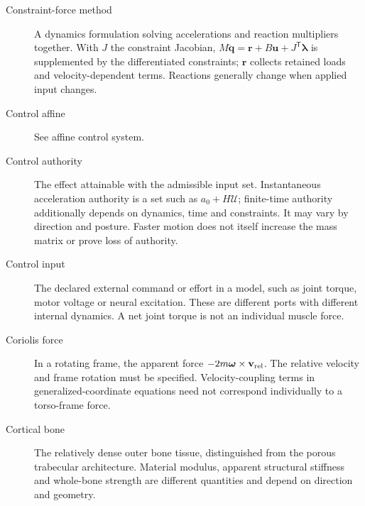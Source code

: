 \begin{description}
\item[Constraint-force method] A dynamics formulation solving accelerations and reaction multipliers together. With $J$ the constraint Jacobian, $M\ddot{\mathbf{q}}=\mathbf{r}+B\mathbf{u}+J^\mathsf{T}\boldsymbol{\lambda}$ is supplemented by the differentiated constraints; $\mathbf{r}$ collects retained loads and velocity-dependent terms. Reactions generally change when applied input changes.

\item[Control affine] See affine control system.

\item[Control authority] The effect attainable with the admissible input set. Instantaneous acceleration authority is a set such as $a_0+H\mathcal{U}$; finite-time authority additionally depends on dynamics, time and constraints. It may vary by direction and posture. Faster motion does not itself increase the mass matrix or prove loss of authority.

\item[Control input] The declared external command or effort in a model, such as joint torque, motor voltage or neural excitation. These are different ports with different internal dynamics. A net joint torque is not an individual muscle force.

\item[Coriolis force] In a rotating frame, the apparent force $-2m\boldsymbol{\omega}\times\mathbf{v}_{\rm rel}$. The relative velocity and frame rotation must be specified. Velocity-coupling terms in generalized-coordinate equations need not correspond individually to a torso-frame force.

\item[Cortical bone] The relatively dense outer bone tissue, distinguished from the porous trabecular architecture. Material modulus, apparent structural stiffness and whole-bone strength are different quantities and depend on direction and geometry.

\end{description}
